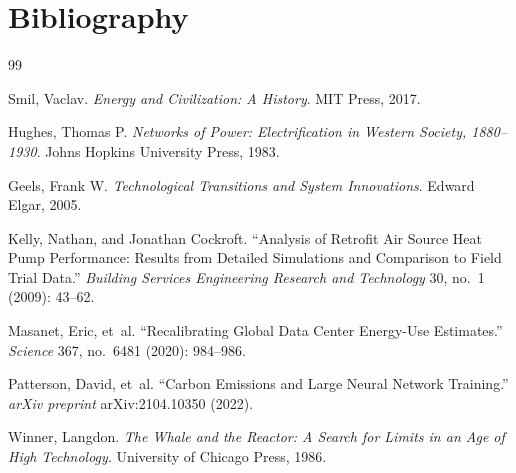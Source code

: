 \documentclass[12pt, oneside]{article}
\begin{document}
\newpage
\section*{Bibliography}

\begin{thebibliography}{99}

Smil, Vaclav.
\textit{Energy and Civilization: A History}.
MIT Press, 2017.

Hughes, Thomas P.
\textit{Networks of Power: Electrification in Western Society, 1880--1930}.
Johns Hopkins University Press, 1983.

Geels, Frank W.
\textit{Technological Transitions and System Innovations}.
Edward Elgar, 2005.

Kelly, Nathan, and Jonathan Cockroft.
``Analysis of Retrofit Air Source Heat Pump Performance: Results from Detailed Simulations and Comparison to Field Trial Data.''
\textit{Building Services Engineering Research and Technology} 30, no.~1 (2009): 43--62.

Masanet, Eric, et~al.
``Recalibrating Global Data Center Energy-Use Estimates.''
\textit{Science} 367, no.~6481 (2020): 984--986.

Patterson, David, et~al.
``Carbon Emissions and Large Neural Network Training.''
\textit{arXiv preprint} arXiv:2104.10350 (2022).

Winner, Langdon.
\textit{The Whale and the Reactor: A Search for Limits in an Age of High Technology}.
University of Chicago Press, 1986.

\end{thebibliography}
\end{document}
